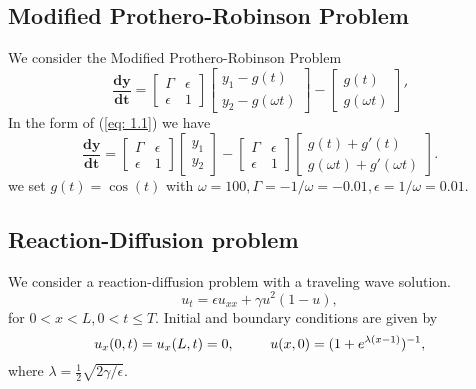 \documentclass[12pt]{article}
\begin{document}
\subsection{Modified Prothero-Robinson Problem}
We consider the Modified Prothero-Robinson Problem
\begin{equation}
\mathbf{\frac{dy}{dt}} = \begin{bmatrix}
\Gamma & \epsilon \\ \epsilon & 1
\end{bmatrix}    \begin{bmatrix} y_1 - g(t) \\ y_2 - g(\omega t) \end{bmatrix} - \begin{bmatrix}
g(t) \\ g(\omega t)
\end{bmatrix}' 
\end{equation}
In the form of (\ref{eq: 1.1}) we have \begin{equation}
\mathbf{\frac{dy}{dt}} = \begin{bmatrix}
\Gamma & \epsilon \\ \epsilon & 1
\end{bmatrix}    \begin{bmatrix} y_1 \\ y_2 \end{bmatrix} - \begin{bmatrix}
\Gamma & \epsilon \\ \epsilon & 1
\end{bmatrix} \begin{bmatrix} g(t)+ g'(t)\\ g(\omega t)+g'(\omega t) \end{bmatrix}. 
\end{equation}
we set $g(t) = \cos(t)$ with $\omega = 100, \Gamma = - 1/ \omega = -0.01 , \epsilon = 1/\omega = 0.01$.

\subsection{Reaction-Diffusion problem}
We consider a reaction-diffusion problem with a traveling wave solution.
\begin{equation}
u_t = \epsilon u_{xx} + \gamma u^2(1 - u),
\end{equation}
for $0<x<L, 0<t\leq T$. Initial and boundary conditions are given by
\begin{equation}
u_x(0,t) = u_x(L,t) = 0 , \hspace{9mm} u(x,0) = (1+ e^{\lambda(x-1)})^{-1},
\end{equation}
where $\lambda = \frac{1}{2} \sqrt{2 \gamma/\epsilon}$.
\end{document}
